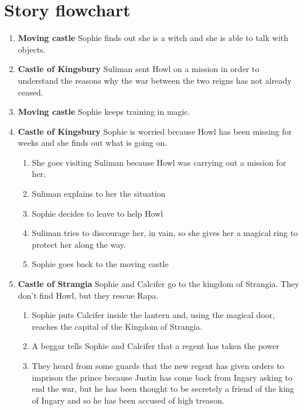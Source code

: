 \section{Story flowchart}

\begin{enumerate}
\item \textbf{Moving castle} Sophie finds out she is a witch and she is able to talk with objects.
  
\item \textbf{Castle of Kingsbury} Suliman sent Howl on a mission in order to understand the reasons why the war between the two reigns has not already ceased.
  
\item \textbf{Moving castle} Sophie keeps training in magic.
  
\item \textbf{Castle of Kingsbury} Sophie is worried because Howl has been missing for weeks and she finds out what is going on.
  \begin{enumerate}
  \item She goes visiting Suliman because Howl was carrying out a mission for her.
    
  \item Suliman explains to her the situation

  \item Sophie decides to leave to help Howl

  \item Suliman tries to discourage her, in vain, so she gives her a magical ring to protect her along the way.

  \item Sophie goes back to the moving castle
  \end{enumerate}

\item \textbf{Castle of Strangia} Sophie and Calcifer go to the kingdom of Strangia. They don’t find Howl, but they rescue Rapa.

  \begin{enumerate}
  \item Sophie puts Calcifer inside the lantern and, using the magical door, reaches  the capital of the Kingdom of Strangia.
    
  \item A beggar tells Sophie and Calcifer that a regent has taken the power
    
  \item They heard from some guards that the new regent has given orders to imprison the prince because Justin has come back from Ingary asking to end the war, but he has been thought to be secretely a friend of the king of Ingary and so he has been accused of high treason.
    

\end{enumerate}
\end{enumerate}
